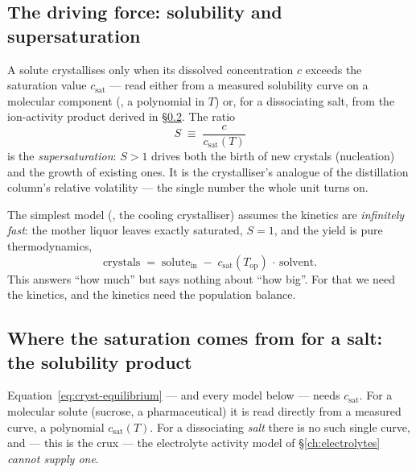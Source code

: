 \documentclass[11pt,a4paper]{article}
\begin{document}
\subsection{The driving force: solubility and supersaturation}

A solute crystallises only when its dissolved concentration $c$
exceeds the saturation value $c_{\text{sat}}$ --- read either from a
measured solubility curve on a molecular component (, a polynomial in $T$) or, for a dissociating salt,
from the ion-activity product derived in \S\ref{ch:cryst-ksp}.  The ratio
\begin{equation}
   S \;\equiv\; \frac{c}{c_{\text{sat}}(T)}
\end{equation}
is the \emph{supersaturation}: $S>1$ drives both the birth of new
crystals (nucleation) and the growth of existing ones.  It is the
crystalliser's analogue of the distillation column's relative
volatility --- the single number the whole unit turns on.

The simplest model (, the cooling
crystalliser) assumes the kinetics are \emph{infinitely fast}: the
mother liquor leaves exactly saturated, $S=1$, and the yield is pure
thermodynamics,
\begin{equation}
   \text{crystals} \;=\; \text{solute}_{\text{in}}
   \;-\; c_{\text{sat}}(T_{\text{op}})\,\cdot\,\text{solvent}.
   \label{eq:cryst-equilibrium}
\end{equation}
This answers ``how much'' but says nothing about ``how big''.  For that
we need the kinetics, and the kinetics need the population balance.

\subsection{Where the saturation comes from for a salt: the solubility
product}\label{ch:cryst-ksp}

Equation~\eqref{eq:cryst-equilibrium} --- and every model below --- needs
$c_{\text{sat}}$.  For a molecular solute (sucrose, a pharmaceutical) it is
read directly from a measured 
curve, a polynomial $c_{\text{sat}}(T)$.  For a dissociating \emph{salt}
there is no such single curve, and --- this is the crux --- the
electrolyte activity model of \S\ref{ch:electrolytes} \emph{cannot supply
one}.
\end{document}
